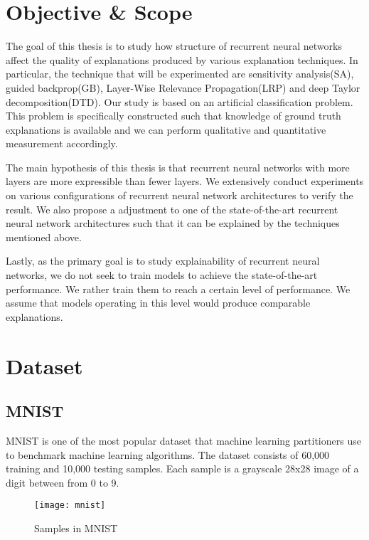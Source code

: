 \section{Objective \& Scope}
The goal of this thesis is to  study how structure of recurrent neural networks affect the quality of explanations produced by various explanation techniques. In particular, the technique that will be experimented are sensitivity analysis(SA), guided backprop(GB), Layer-Wise Relevance Propagation(LRP) and deep Taylor decomposition(DTD). Our study is based on an artificial classification problem. This problem is specifically constructed such that  knowledge of ground truth explanations is available and we can perform qualitative and quantitative measurement accordingly.

The main hypothesis of this thesis is that recurrent neural networks with more layers are more expressible than fewer layers. We extensively conduct experiments on various configurations of recurrent neural network architectures to verify the result. We also propose a adjustment to one of the state-of-the-art recurrent neural network architectures such that it can be explained by the techniques mentioned above.

Lastly, as the primary goal is to study explainability of recurrent neural networks, we do not seek to train models to achieve the state-of-the-art performance. We rather train them to reach a certain level of performance. We assume that models operating in this level would  produce comparable explanations.


%
%
%


\section{Dataset}


\subsection{MNIST}
MNIST\cite{LeCunMNISThandwrittendigit2010} is one of the most popular dataset that machine learning partitioners use to benchmark machine learning algorithms. The dataset consists of 60,000 training and 10,000 testing samples. Each sample is a grayscale 28x28 image of a digit between from 0 to 9. 

\begin{figure}[!hbt]
\centering
\texttt{[image: mnist]}
\caption{Samples in MNIST}
\label{fig:mnist_samples}
\end{figure}


